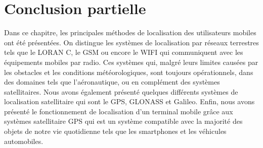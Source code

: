 \section{Conclusion partielle}
Dans ce chapitre, les principales méthodes de localisation des utilisateurs mobiles ont été présentées. On distingue les systèmes de localisation par réseaux terrestres tels que le LORAN C, le GSM ou encore le WIFI qui communiquent avec les équipements mobiles par radio. Ces systèmes qui, malgré leurs limites causées par les obstacles et les conditions météorologiques, sont toujours opérationnels, dans des domaines tels que l’aéronautique, ou en complément des systèmes satellitaires. Nous avons également présenté quelques différents systèmes de localisation satellitaire qui sont le GPS, GLONASS et Galileo. Enfin, nous avons présenté le fonctionnement de localisation d’un terminal mobile grâce aux systèmes satellitaire GPS qui est un système compatible avec la majorité des objets de notre vie quotidienne tels que les smartphones et les véhicules automobiles.
